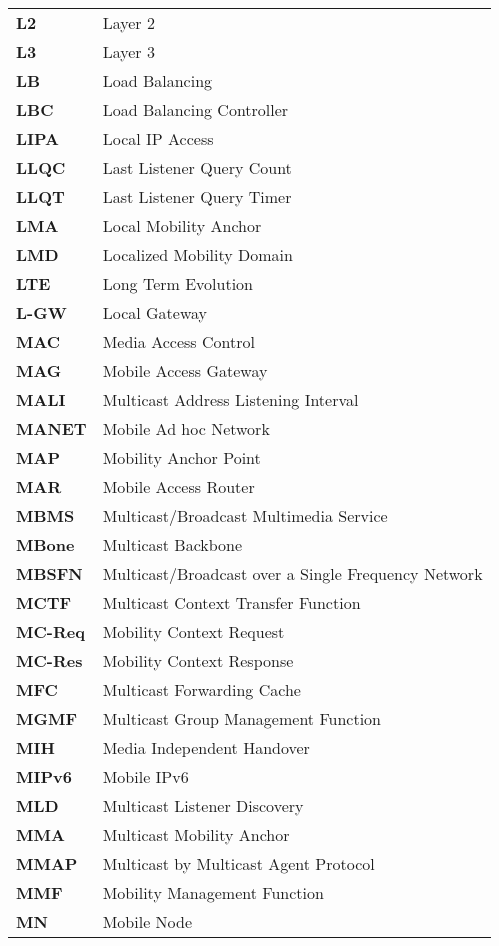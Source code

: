 \begin{center}
\begin{longtable}{p{5cm}p{8.8cm}}
\textbf{L2} & Layer 2\\
\textbf{L3} & Layer 3\\
\textbf{LB} & Load Balancing\\
\textbf{LBC} & Load Balancing Controller\\
\textbf{LIPA} & Local IP Access \\
\textbf{LLQC} & Last Listener Query Count \\
\textbf{LLQT} & Last Listener Query Timer \\
\textbf{LMA} & Local Mobility Anchor\\
\textbf{LMD} & Localized Mobility Domain\\
\textbf{LTE} & Long Term Evolution\\
\textbf{L-GW} & Local Gateway\\
\textbf{MAC} & Media Access Control\\
\textbf{MAG} & Mobile Access Gateway\\
\textbf{MALI} & Multicast Address Listening Interval\\
\textbf{MANET} & Mobile Ad hoc Network \\
\textbf{MAP} & Mobility Anchor Point \\
\textbf{MAR} & Mobile Access Router \\
\textbf{MBMS} & Multicast/Broadcast Multimedia Service\\
\textbf{MBone} & Multicast Backbone\\
\textbf{MBSFN} & Multicast/Broadcast over a Single Frequency Network\\
\textbf{MCTF} & Multicast Context Transfer Function\\
\textbf{MC-Req} & Mobility Context Request \\
\textbf{MC-Res} & Mobility Context Response \\
\textbf{MFC} & Multicast Forwarding Cache \\
\textbf{MGMF} & Multicast Group Management Function \\
\textbf{MIH} & Media Independent Handover \\
\textbf{MIPv6} & Mobile IPv6\\
\textbf{MLD} & Multicast Listener Discovery\\
\textbf{MMA} & Multicast Mobility Anchor\\
\textbf{MMAP} & Multicast by Multicast Agent Protocol\\
\textbf{MMF} & Mobility Management Function \\
\textbf{MN} & Mobile Node\\

\end{longtable}
\end{center}
